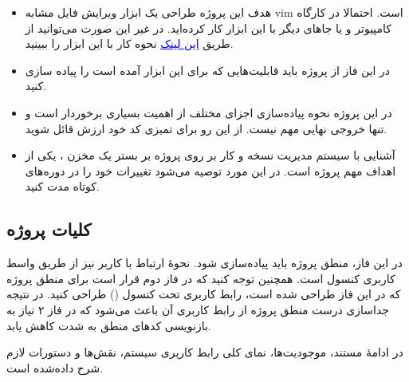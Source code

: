 \documentclass[]{article}
\begin{document}
\begin{itemize}

\item
هدف این پروژه طراحی یک ابزار ویرایش فایل مشابه vim است. احتمالا در کارگاه کامپیوتر و یا جاهای دیگر با این ابزار کار کرده‌اید. در غیر این صورت می‌توانید از طریق \href{https://www.openvim.com}{\textcolor{blue}{\underline{این لینک}}} نحوه کار با این ابزار را ببینید.

\item
در این فاز از پروژه باید قابلیت‌هایی که برای این ابزار آمده است را پیاده سازی کنید.

\item
در این پروژه نحوه پیاده‌سازی اجزای مختلف از اهمیت بسیاری برخوردار است و تنها خروجی نهایی مهم نیست. از این رو برای تمیزی کد خود ارزش قائل شوید. 

\item
آشنایی با سیستم مدیریت نسخه  و کار بر روی پروژه بر بستر یک مخزن ، یکی از اهداف مهم پروژه است. در این مورد توصیه می‌شود تغییرات خود را در دوره‌های کوتاه مدت  کنید.

\end{itemize}

\subsection*{{\titr کلیات پروژه}}

در این فاز، منطق پروژه باید پیاده‌سازی شود. نحوهٔ ارتباط با کاربر نیز از طریق واسط کاربری کنسول است.
همچنین توجه کنید که در فاز دوم قرار است برای منطق پروژه که در این فاز طراحی شده است، رابط کاربری تحت کنسول () طراحی کنید. در نتیجه جداسازی درست منطق پروژه از رابط کاربری آن باعث می‌شود که در فاز ۲ نیاز به بازنویسی کدهای منطق به شدت کاهش یابد. 

در ادامهٔ مستند، موجودیت‌ها، نمای کلی رابط کاربری سیستم، نقش‌ها و دستورات لازم شرح داده‌شده است.
\end{document}
